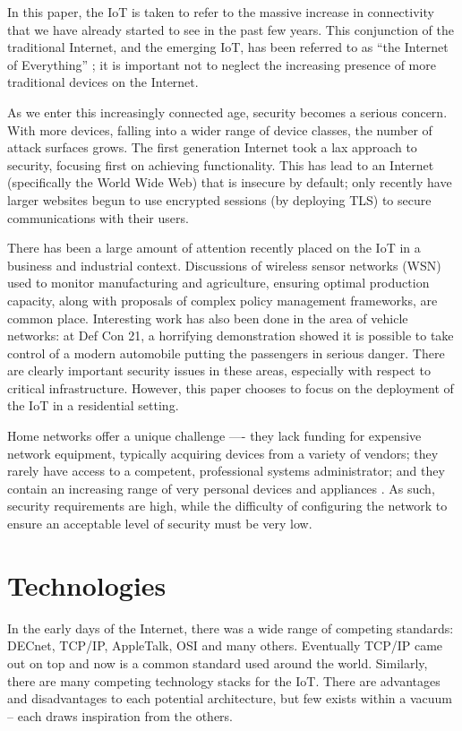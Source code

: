 \documentclass[10pt,journal,compsoc]{IEEEtran}
\begin{document}
In this paper, the IoT is taken to refer to the massive increase in
connectivity that we have already started to see in the past few years. This
conjunction of the traditional Internet, and the emerging IoT, has been
referred to as ``the Internet of Everything'' \cite{CiscoEverything}; it is
important not to neglect the increasing presence of more traditional devices on
the Internet. 

As we enter this increasingly connected age, security becomes a serious
concern. With more devices, falling into a wider range of device classes, the
number of attack surfaces grows. The first generation Internet took a lax
approach to security, focusing first on achieving functionality. This has lead
to an Internet (specifically the World Wide Web) that is insecure by default;
only recently have larger websites begun to use encrypted sessions (by
deploying TLS) to secure communications with their users. 

There has been a large amount of attention recently placed on the IoT in a
business and industrial context. Discussions of wireless sensor networks (WSN)
used to monitor manufacturing and agriculture, ensuring optimal production
capacity, along with proposals of complex policy management frameworks, are
common place. Interesting work has also been done in the area of vehicle
networks: at Def Con 21, a horrifying demonstration showed it is possible to
take control of a modern automobile \cite{Illera2014} putting the passengers in
serious danger.  There are clearly important security issues in these areas,
especially with respect to critical infrastructure. However, this paper chooses
to focus on the deployment of the IoT in a residential setting. 

Home networks offer a unique challenge —- they lack funding for expensive
network equipment, typically acquiring devices from a variety of vendors; they
rarely have access to a competent, professional systems administrator; and they
contain an increasing range of very personal devices and appliances
\cite{ACM_ModHome}. As such, security requirements are high, while the
difficulty of configuring the network to ensure an acceptable level of security
must be very low. 


\section{Technologies}
In the early days of the Internet, there was a wide range of competing
standards: DECnet, TCP/IP, AppleTalk, OSI and many others. Eventually TCP/IP
came out on top and now is a common standard used around the world. Similarly,
there are many competing technology stacks for the IoT. There are advantages
and disadvantages to each potential architecture, but few exists within a
vacuum -- each draws inspiration from the others. 
\end{document}
